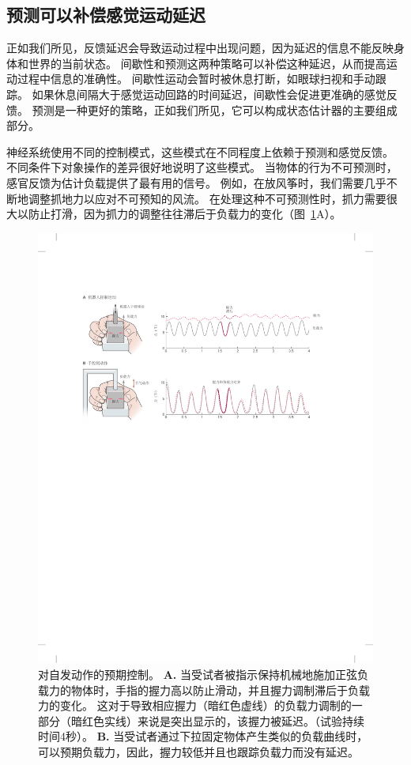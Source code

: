 \subsection{预测可以补偿感觉运动延迟}

正如我们所见，反馈延迟会导致运动过程中出现问题，因为延迟的信息不能反映身体和世界的当前状态。
间歇性和预测这两种策略可以补偿这种延迟，从而提高运动过程中信息的准确性。
间歇性运动会暂时被休息打断，如眼球扫视和手动跟踪。
如果休息间隔大于感觉运动回路的时间延迟，间歇性会促进更准确的感觉反馈。
预测是一种更好的策略，正如我们所见，它可以构成状态估计器的主要组成部分。


神经系统使用不同的控制模式，这些模式在不同程度上依赖于预测和感觉反馈。
不同条件下对象操作的差异很好地说明了这些模式。
当物体的行为不可预测时，感官反馈为估计负载提供了最有用的信号。
例如，在放风筝时，我们需要几乎不断地调整抓地力以应对不可预知的风流。 
在处理这种不可预测性时，抓力需要很大以防止打滑，因为抓力的调整往往滞后于负载力的变化（图~\ref{fig:30_6}A）。


\begin{figure}[htbp]
	\centering
	\includegraphics[width=1.0\linewidth]{chap30/fig_30_6}
	\caption{对自发动作的预期控制\cite{blakemore1998predicting}。
		\textbf{A.} 当受试者被指示保持机械地施加正弦负载力的物体时，手指的握力高以防止滑动，并且握力调制滞后于负载力的变化。
		这对于导致相应握力（暗红色虚线）的负载力调制的一部分（暗红色实线）来说是突出显示的，该握力被延迟。（试验持续时间4秒）。
		\textbf{B.} 当受试者通过下拉固定物体产生类似的负载曲线时，可以预期负载力，因此，握力较低并且也跟踪负载力而没有延迟。}
	\label{fig:30_6}
\end{figure}


